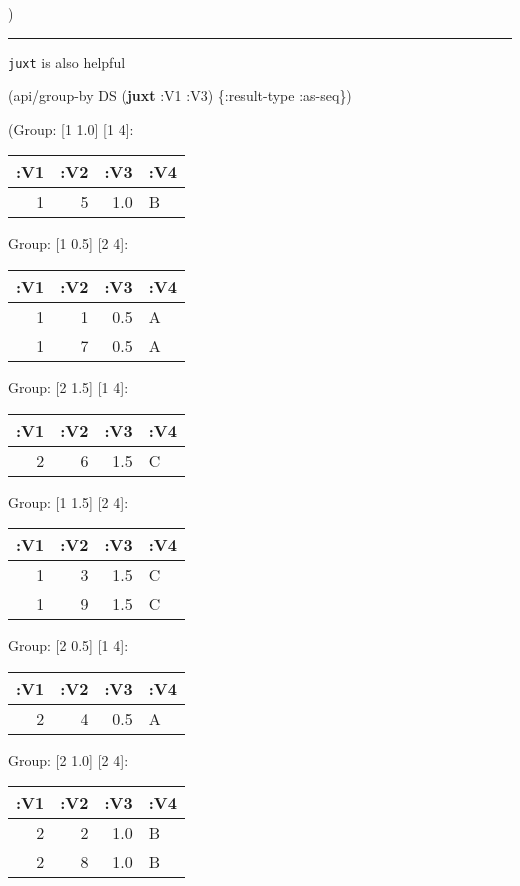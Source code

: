 \documentclass[]{article}
\newenvironment{Shaded}{\begin{snugshade}}{\end{snugshade}}
\newcommand{\KeywordTok}[1]{\textcolor[rgb]{0.13,0.29,0.53}{\textbf{#1}}}
\newcommand{\AttributeTok}[1]{\textcolor[rgb]{0.77,0.63,0.00}{#1}}
\newcommand{\NormalTok}[1]{#1}
\begin{document}
)

\begin{center}\rule{0.5\linewidth}{0.5pt}\end{center}

\texttt{juxt} is also helpful

\begin{Shaded}
\begin{Highlighting}[]
\NormalTok{(api/group-by DS (}\KeywordTok{juxt} \AttributeTok{:V1} \AttributeTok{:V3}\NormalTok{) \{}\AttributeTok{:result-type} \AttributeTok{:as-seq}\NormalTok{\})}
\end{Highlighting}
\end{Shaded}

(Group: {[}1 1.0{]} {[}1 4{]}:

\begin{longtable}[]{@{}rrrl@{}}
\toprule
:V1 & :V2 & :V3 & :V4\tabularnewline
\midrule
\endhead
1 & 5 & 1.0 & B\tabularnewline
\bottomrule
\end{longtable}

Group: {[}1 0.5{]} {[}2 4{]}:

\begin{longtable}[]{@{}rrrl@{}}
\toprule
:V1 & :V2 & :V3 & :V4\tabularnewline
\midrule
\endhead
1 & 1 & 0.5 & A\tabularnewline
1 & 7 & 0.5 & A\tabularnewline
\bottomrule
\end{longtable}

Group: {[}2 1.5{]} {[}1 4{]}:

\begin{longtable}[]{@{}rrrl@{}}
\toprule
:V1 & :V2 & :V3 & :V4\tabularnewline
\midrule
\endhead
2 & 6 & 1.5 & C\tabularnewline
\bottomrule
\end{longtable}

Group: {[}1 1.5{]} {[}2 4{]}:

\begin{longtable}[]{@{}rrrl@{}}
\toprule
:V1 & :V2 & :V3 & :V4\tabularnewline
\midrule
\endhead
1 & 3 & 1.5 & C\tabularnewline
1 & 9 & 1.5 & C\tabularnewline
\bottomrule
\end{longtable}

Group: {[}2 0.5{]} {[}1 4{]}:

\begin{longtable}[]{@{}rrrl@{}}
\toprule
:V1 & :V2 & :V3 & :V4\tabularnewline
\midrule
\endhead
2 & 4 & 0.5 & A\tabularnewline
\bottomrule
\end{longtable}

Group: {[}2 1.0{]} {[}2 4{]}:

\begin{longtable}[]{@{}rrrl@{}}
\toprule
:V1 & :V2 & :V3 & :V4\tabularnewline
\midrule
\endhead
2 & 2 & 1.0 & B\tabularnewline
2 & 8 & 1.0 & B\tabularnewline
\bottomrule
\end{longtable}
\end{document}
